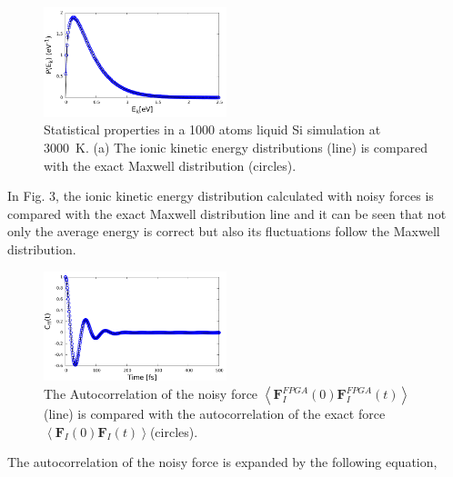 \begin{figure}[h!]%
\begin{center}
\includegraphics[width=0.475\textwidth]
{figures/maxwelldistribution.pdf}
\end{center}
\caption{\label{Fig3}
Statistical properties in a 1000 atoms liquid Si simulation at 3000~K. (a) The ionic kinetic energy distributions (line) is compared with the exact Maxwell distribution (circles).
} \end{figure}

In Fig. 3, the ionic kinetic energy distribution calculated with noisy forces is compared with the exact Maxwell distribution line and it can be seen that not only the average energy is correct but also its fluctuations follow the Maxwell distribution. 

\begin{figure}[h!]%
\begin{center}
\includegraphics[width=0.475\textwidth]
{figures/force_autocorrelation.pdf}
\end{center}
\caption{\label{Fig4}
The Autocorrelation of the noisy force \(
\left \langle \textbf{F}_{I}^{FPGA}\left ( 0 \right ) \textbf{F}_{I}^{FPGA}\left ( t \right )\right \rangle \)(line) is compared with the autocorrelation of the exact force \( \left \langle \textbf{F}_{I}\left ( 0 \right ) \textbf{F}_{I}\left ( t \right )\right \rangle \)(circles). 
} \end{figure}

The autocorrelation of the noisy force is expanded by the following equation, 

